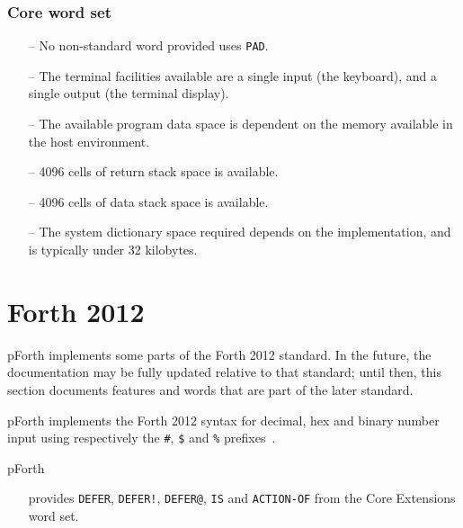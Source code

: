 \documentclass[english]{article}
\begin{document}
\subsubsection{Core word set}

\begin{itemize}
\item[--]No non-standard word provided uses {\tt PAD}.
\item[--]The terminal facilities available are a single input (the keyboard), and a single output (the terminal display).
\item[--]The available program data space is dependent on the memory available in the host environment.
\item[--]4096 cells of return stack space is available.
\item[--]4096 cells of data stack space is available.
\item[--]The system dictionary space required depends on the implementation, and is typically under 32 kilobytes.
\end{itemize}


\section{Forth 2012}
\label{forth2012}

pForth implements some parts of the Forth 2012 standard. In the future, the documentation may be fully updated relative to that standard; until then, this section documents features and words that are part of the later standard.

pForth implements the Forth 2012 syntax for decimal, hex and binary number input using respectively the {\tt \#}, {\tt \$} and {\tt \%} prefixes~\cite[section 3.4.1.3 “Text interpreter input number conversion”]{forth2012}.

pForth
\vspace{-3mm}
\begin{itemize}
\item[]provides {\tt DEFER}, {\tt DEFER!}, {\tt DEFER@}, {\tt IS} and {\tt ACTION-OF} from the Core Extensions word set.
\end{itemize}




\end{document}
